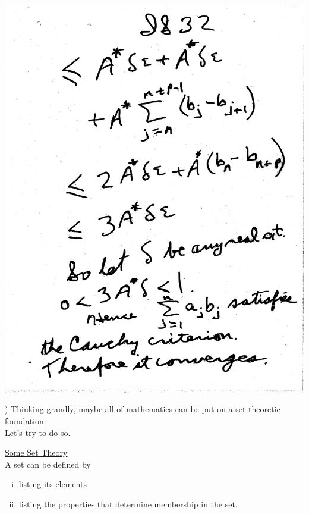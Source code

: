 \documentclass[10pt,a4paper]{article}
\begin{document}
\includegraphics[scale=.5]{Pages/IS_32}

\newpage

) Thinking grandly, maybe all of mathematics can be put on a set theoretic foundation.\\ \indent Let's try to do so. 
\\ \vspace{2mm}
\hrulefill

\noindent \underline{Some Set Theory}
\vspace{2mm}
\\ \noindent A set can be defined by 
\begin{enumerate} [(i)]
\item listing its elements
\item listing the properties that determine membership in the set.
\end{enumerate}
\end{document}
